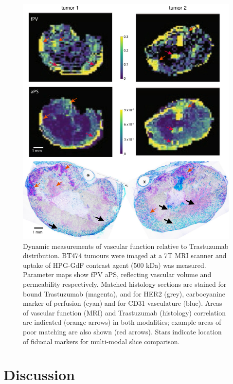 \begin{figure}[htbp] %
  \centering
  \includegraphics[width=\textwidth]{hpg/hpg-paper2-images/Fig6.png} 
  \caption{Dynamic measurements of vascular function relative to Trastuzumab distribution. \acs{BT474} tumours were imaged at a 7T MRI scanner and uptake of \acs{HPG-GdF} contrast agent (500 kDa) was measured. 
  Parameter maps show \acs{fPV} \acs{aPS}, reflecting vascular volume and permeability respectively. 
  Matched histology sections are stained for bound Trastuzumab (magenta), and for \acs{HER2} (grey), carbocyanine marker of perfusion (cyan) and for CD31 vasculature (blue). 
  Areas of vascular function (MRI) and Trastuzumab (histology) correlation are indicated (orange arrows) in both modalities; example areas of poor matching are also shown (red arrows). 
  Stars indicate location of fiducial markers for multi-modal slice comparison.}
  \label{hpgpaper2:fig6}
\end{figure}

\section{Discussion}

